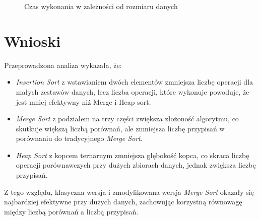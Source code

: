 \documentclass[a4paper,12pt]{article}
\begin{document}
\begin{figure}[H]
    \centering
    \caption{Czas wykonania w zależności od rozmiaru danych}
\end{figure}

\newpage
\section{Wnioski}
Przeprowadzona analiza wykazała, że:
\begin{itemize}
    \item \textit{Insertion Sort} z wstawianiem dwóch elementów zmniejsza liczbę operacji dla małych zestawów danych, lecz liczba operacji, które wykonuje powoduje, że jest mniej efektywny niż Merge i Heap sort.
    \item \textit{Merge Sort} z podziałem na trzy części zwiększa złożoność algorytmu, co skutkuje większą liczbą porównań, ale zmniejsza liczbę przypisań w porównaniu do tradycyjnego \textit{Merge Sort}.
    \item \textit{Heap Sort} z kopcem ternarnym zmniejsza głębokość kopca, co skraca liczbę operacji porównawczych przy dużych zbiorach danych, jednak zwiększa liczbę przypisań.
\end{itemize}

Z tego względu, klasyczna wersja i zmodyfikowana wersja \textit{Merge Sort} okazały się najbardziej efektywne przy dużych danych, zachowując korzystną równowagę między liczbą porównań a liczbą przypisań.
\end{document}
